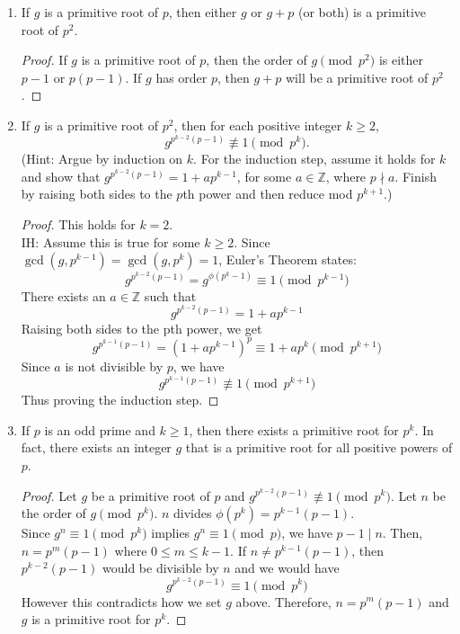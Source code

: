 \documentclass[11pt]{article}
\theoremstyle{definition}
\newcommand{\ZZ}{\mathbb{Z}}
\begin{document}
\begin{enumerate}
\begin{enumerate}
        \item If $g$ is a primitive root of $p$, then either $g$ or $g+p$ (or both) is a primitive root of $p^2$.
        \begin{proof}
            If $g$ is a primitive root of $p$, then the order of $g\pmod{p^2}$ is either $p-1$
            or $p(p-1)$. If $g$ has order $p$, then $g+p$ will be a primitive root
            of $p^2$. 
        \end{proof}

        \item If $g$ is a primitive root of $p^2$, then for each positive integer $k\geq 2$, $$g^{p^{k-2}(p-1)}\not\equiv 1\pmod{p^k}.$$ (Hint: Argue by induction on $k$. For the induction step, assume it holds for $k$ and show that $g^{p^{k-2}(p-1)} = 1 + ap^{k-1}$, for some $a\in \ZZ$, where $p\nmid a$. Finish by raising both sides to the $p$th power and then reduce mod $p^{k+1}$.)
        \begin{proof}
            This holds for $k=2$. \\
            IH: Assume this is true for some $k\ge 2$. Since $\gcd(g, p^{k-1}) = \gcd(g, p^k) = 1$, 
            Euler's Theorem states:
            \[
                g^{p^{k-2}(p-1)} = g^{\phi(p^k-1)} \equiv 1\pmod{p^{k-1}}
            \]
            There exists an $a\in\ZZ$ such that
            \[
                g^{p^{k-2}(p-1)} = 1 + ap^{k-1}
            \]
            Raising both sides to the pth power, we get 
            \[
                g^{p^{k-1}(p-1)} = (1+ap^{k-1})^p \equiv 1+ap^k\pmod{p^{k+1}}
            \]
            Since $a$ is not divisible by $p$, we have
            \[
                g^{p^{k-1}(p-1)} \not\equiv 1\pmod{p^{k+1}}
            \]
            Thus proving the induction step.
        \end{proof}
        
        \item If $p$ is an odd prime and $k\geq 1$, then there exists a primitive root for $p^k$. In fact, there exists an integer $g$ that is a primitive root for all positive powers of $p$.
        \begin{proof}
            Let $g$ be a primitive root of $p$ and $g^{p^{k-2}(p-1)}\not\equiv 1\pmod{p^k}$.
            Let $n$ be the order of $g\pmod{p^k}$. $n$ divides $\phi(p^k)=p^{k-1}(p-1)$. \\
            Since $g^n\equiv 1\pmod{p^k}$ implies $g^n\equiv 1\pmod{p}$, we have $p-1\mid n$. 
            Then, $n=p^m(p-1)$ where $0\le m\le k-1$. If $n\ne p^{k-1}(p-1)$, then $p^{k-2}(p-1)$
            would be divisible by $n$ and we would have
            \[ g^{p^{k-2}(p-1)}\equiv 1\pmod{p^k} \]
            However this contradicts how we set $g$ above. Therefore,
            $n=p^m(p-1)$ and $g$ is a primitive root for $p^k$.

        \end{proof}
    \end{enumerate}

    
\end{enumerate}
\end{document}
